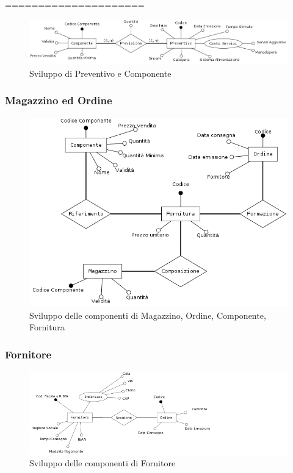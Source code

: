 			=====================
		
			
				
			\begin{figure}[H]
				\centering
				\includegraphics[width=11.5cm]{images/finitures/preventivo_componente.png}
				\caption{Sviluppo di Preventivo e Componente}
				\label{fig:preventivo_componente}
			\end{figure}
		
		\subsubsection{Magazzino ed Ordine}
		
			\begin{figure}[H]
				\centering
				\includegraphics[width=11.5cm]{images/finitures/componente_fornitura_ordine_magazzino.png}
				\caption{Sviluppo delle componenti di Magazzino, Ordine, Componente, Fornitura}
				\label{fig:componente_fornitura_ordine_magazzino}
			\end{figure}
		
		\subsubsection{Fornitore}
			
			\begin{figure}[H]
				\centering
				\includegraphics[width=11.5cm]{images/finitures/ordine_fornitore.png}
				\caption{Sviluppo delle componenti di Fornitore}
				\label{fig:ordine_fornitore}
			\end{figure}
			
